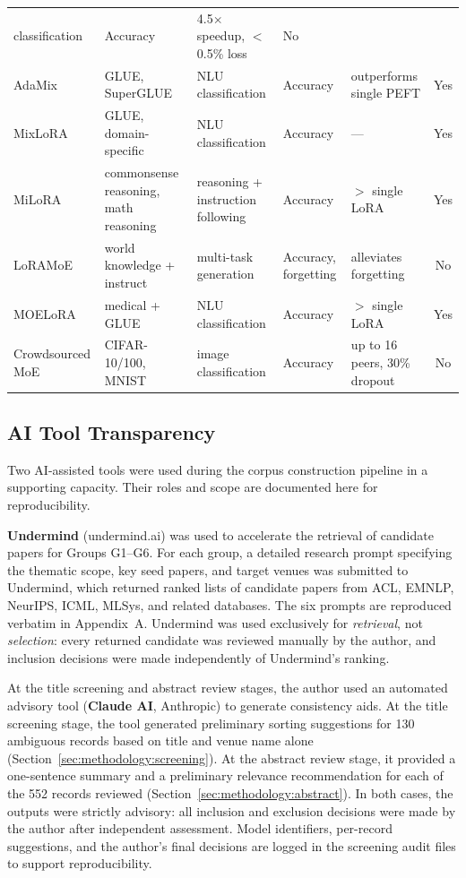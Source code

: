 \begin{table}
{\begin{tabular}{lllllc}
  classification & Accuracy & 4.5$\times$ speedup, $<$0.5\% loss & No \\
  AdaMix~\citep{WangAdaMix2022} & GLUE, SuperGLUE & NLU classification &
  Accuracy & outperforms single PEFT & Yes \\
  MixLoRA~\citep{LiMixLoRA2024} & GLUE, domain-specific & NLU classification &
  Accuracy & --- & Yes \\
MiLoRA~\citep{ZhangMiLoRA2024} & commonsense reasoning, math reasoning & 
reasoning + instruction following & Accuracy & $>$ single LoRA & Yes \\
  LoRAMoE~\citep{DouLoRAMoE2024} & world knowledge + instruct & multi-task
  generation & Accuracy, forgetting & alleviates forgetting & No \\
  MOELoRA~\citep{LiuMOELoRA2023} & medical + GLUE & NLU classification &
  Accuracy & $>$ single LoRA & Yes \\
  Crowdsourced MoE~\citep{RyabininCrowdsourced2020} & CIFAR-10/100, MNIST &
  image classification & Accuracy & up to 16 peers, 30\% dropout & No \\
  \midrule
\bottomrule
  \end{tabular}
  }
  \end{table}



\subsection{AI Tool Transparency}
\label{sec:methodology:ai}

Two AI-assisted tools were used during the corpus construction pipeline
in a supporting capacity. Their roles and scope are documented here for
reproducibility.

\textbf{Undermind} (undermind.ai) was used to accelerate the retrieval
of candidate papers for Groups G1--G6. For each group, a detailed
research prompt specifying the thematic scope, key seed papers, and
target venues was submitted to Undermind, which returned ranked lists
of candidate papers from ACL, EMNLP, NeurIPS, ICML, MLSys, and related
databases. The six prompts are reproduced verbatim in Appendix~A.
Undermind was used exclusively for \textit{retrieval}, not
\textit{selection}: every returned candidate was reviewed manually by
the author, and inclusion decisions were made independently of
Undermind's ranking.

At the title screening and abstract review stages, the author used an automated
advisory tool (\textbf{Claude AI}, Anthropic) to generate consistency aids.
At the title screening stage, the tool generated preliminary sorting suggestions
for 130 ambiguous records based on title and venue name alone
(Section~\ref{sec:methodology:screening}). At the abstract review stage, it
provided a one-sentence summary and a preliminary relevance recommendation for
each of the 552 records reviewed (Section~\ref{sec:methodology:abstract}). In
both cases, the outputs were strictly advisory: all inclusion and exclusion
decisions were made by the author after independent assessment. Model identifiers,
per-record suggestions, and the author's final decisions are logged in the
screening audit files to support reproducibility.

